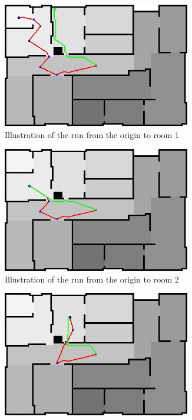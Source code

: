 \documentclass[../Head/Main.tex]{subfiles}
\begin{document}
\begin{figure}[H]
  \begin{subfigure}[b]{0.49\textwidth}
    \centering
    \includegraphics[width=0.9\textwidth]{brushfireAndBugTest1}
    \caption{Illustration of the run from the origin to room 1}
    \label{fig:Test1}
  \end{subfigure}
  \hfill
  \begin{subfigure}[b]{0.49\textwidth}
    \centering
    \includegraphics[width=0.9\textwidth]{brushfireAndBugTest2}
    \caption{Illustration of the run from the origin to room 2}
    \label{fig:Test2}
  \end{subfigure}
  \hfill
  \begin{subfigure}[b]{0.49\textwidth}
    \centering
    \includegraphics[width=0.9\textwidth]{brushfireAndBugTest3}

\end{subfigure}
\end{figure}
\end{document}
